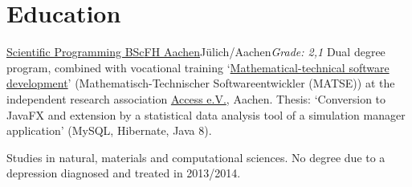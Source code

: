 \documentclass[11pt,a4paper]{moderncv}
\begin{document}
\sffamily   %
\maketitle


\section{Education}


{\href{https://www.fh-aachen.de/en/course-of-study/angewandte-mathematik-und-informatik-bsc/}{Scientific
    Programming BSc}}{\href{https://www.fh-aachen.de/}{FH Aachen}}{Jülich/Aachen}{\textit{Grade: 2,1}}
{Dual degree program, combined with vocational training
  `\href{http://www.rwth-aachen.de/cms/root/Die-RWTH/Jobs-Ausbildung/Berufsausbildung/Ausbildungsberufe/~vsa/Math-techn-Softwareentwickler/?lidx=1}{Mathematical-technical
    software development}' (\glqq{}Mathematisch-Technischer Softwareentwickler
  (MATSE)\grqq{}) at the independent research association
  \href{http://www.access.rwth-aachen.de/}{Access e.V.}, Aachen. Thesis:
  `Conversion to JavaFX and extension by a statistical data analysis tool of a
  simulation manager application' (MySQL, Hibernate, Java 8).}


{Studies in natural, materials and computational sciences. No degree due to a depression diagnosed and treated in 2013/2014.}
\end{document}

